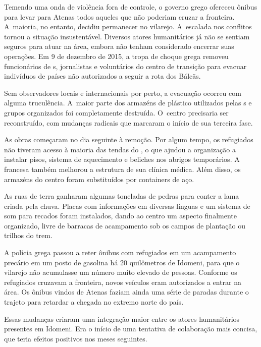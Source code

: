Temendo uma onda de violência fora de controle, o governo grego ofereceu
ônibus para levar para Atenas todos aqueles que não poderiam cruzar a
fronteira. A~maioria, no entanto, decidiu permanecer no vilarejo. A~escalada nos conflitos tornou a situação insustentável. Diversos atores
humanitários já não se sentiam seguros para atuar na área, embora não
tenham considerado encerrar suas operações. Em 9 de dezembro de 2015, a
tropa de choque grega removeu funcionários de s, jornalistas e
voluntários do centro de transição para evacuar indivíduos de países não
autorizados a seguir a rota dos Bálcãs.

Sem observadores locais e internacionais por perto, a evacuação ocorreu
com alguma truculência. A~maior parte dos armazéns de plástico
utilizados pelas s e grupos organizados foi completamente destruída.
O~centro precisaria ser reconstruído, com mudanças radicais que marcaram
o início de sua terceira fase.

As obras começaram no dia seguinte à remoção. Por algum tempo, os
refugiados não tiveram acesso à maioria das tendas do , o que
ajudou a organização a instalar pisos, sistema de aquecimento e beliches nos
abrigos temporários. A~ francesa também melhorou a estrutura de sua
clínica médica. Além disso, os armazéns do centro foram substituídos por
containers de aço.

As ruas de terra ganharam algumas toneladas de pedras para conter a lama
criada pela chuva. Placas com informações em diversas línguas e um
sistema de som para recados foram instalados, dando ao centro um aspecto
finalmente organizado, livre de barracas de acampamento sob os campos de
plantação ou trilhos do trem.

A polícia grega passou a reter ônibus com refugiados em um acampamento
precário em um posto de gasolina há 20 quilômetros de Idomeni, para que
o vilarejo não acumulasse um número muito elevado de pessoas. Conforme
os refugiados cruzavam a fronteira, novos veículos eram autorizados a
entrar na área. Os ônibus vindos de Atenas faziam ainda uma série de
paradas durante o trajeto para retardar a chegada no extremo norte do
país.

Essas mudanças criaram uma integração maior entre os atores humanitários
presentes em Idomeni. Era o início de uma tentativa de colaboração mais
concisa, que teria efeitos positivos nos meses seguintes.

